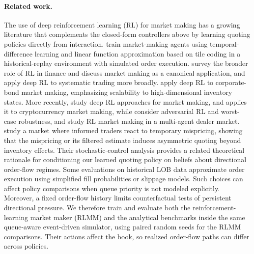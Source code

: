 \documentclass[11pt,a4paper]{article}
\begin{document}
\paragraph{Related work.}
The use of deep reinforcement learning (RL) for market making has a
growing literature that complements the closed-form controllers above
by learning quoting policies directly from interaction.
\citet{spooner2018mm} train market-making agents using temporal-difference
learning and linear function approximation based on tile coding in a
historical-replay environment with simulated order execution.
\citet{kolm2020modern} survey the broader role of RL
in finance and discuss market making as a canonical application, and
\citet{zhang2020deep} apply deep RL to systematic trading more
broadly.  \citet{gueant2019drl} apply deep RL to corporate-bond market
making, emphasizing scalability to high-dimensional inventory states.
More recently, \citet{gasperov2021signals,gasperov2021approaches}
study deep RL approaches for market making, and
\citet{sadighian2019deep} applies it to cryptocurrency market making,
while \citet{spooner2020robust} consider adversarial RL and worst-case
robustness, and \citet{ganesh2019rl} study RL market making in a
multi-agent dealer market.  \citet{barucci2026market} study a market where
informed traders react to temporary mispricing, showing that the
mispricing or its filtered estimate induces asymmetric quoting beyond
inventory effects. Their stochastic-control analysis provides a related
theoretical rationale for conditioning our learned quoting policy on
beliefs about directional order-flow regimes.
Some evaluations on historical LOB data approximate order execution
using simplified fill probabilities or slippage models. Such choices
can affect policy comparisons when queue priority is not modeled
explicitly. Moreover, a fixed order-flow history limits counterfactual
tests of persistent directional pressure.
We therefore train and evaluate both the reinforcement-learning market
maker (RLMM) and the analytical benchmarks inside the same queue-aware
event-driven simulator, using paired random seeds for the RLMM
comparisons. Their actions affect the book, so realized order-flow
paths can differ across policies.
\end{document}
